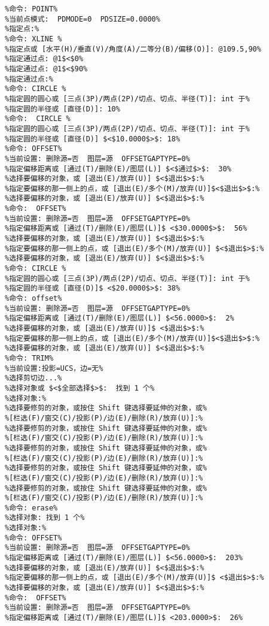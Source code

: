 \begin{lstlisting}
%命令: POINT%
%当前点模式:  PDMODE=0  PDSIZE=0.0000%
%指定点:%
%命令: XLINE %
%指定点或 [水平(H)/垂直(V)/角度(A)/二等分(B)/偏移(O)]: @109.5,90%
%指定通过点: @1$<$0%
%指定通过点: @1$<$90%
%指定通过点:%
%命令: CIRCLE %
%指定圆的圆心或 [三点(3P)/两点(2P)/切点、切点、半径(T)]: int 于%
%指定圆的半径或 [直径(D)]: 10%
%命令:  CIRCLE %
%指定圆的圆心或 [三点(3P)/两点(2P)/切点、切点、半径(T)]: int 于%
%指定圆的半径或 [直径(D)] $<$10.0000$>$: 18%
%命令: OFFSET%
%当前设置: 删除源=否  图层=源  OFFSETGAPTYPE=0%
%指定偏移距离或 [通过(T)/删除(E)/图层(L)] $<$通过$>$:  30%
%选择要偏移的对象，或 [退出(E)/放弃(U)] $<$退出$>$:%
%指定要偏移的那一侧上的点，或 [退出(E)/多个(M)/放弃(U)]$<$退出$>$:%
%选择要偏移的对象，或 [退出(E)/放弃(U)] $<$退出$>$:%
%命令:  OFFSET%
%当前设置: 删除源=否  图层=源  OFFSETGAPTYPE=0%
%指定偏移距离或 [通过(T)/删除(E)/图层(L)]$ <$30.0000$>$:  56%
%选择要偏移的对象，或 [退出(E)/放弃(U)] $<$退出$>$:%
%指定要偏移的那一侧上的点，或 [退出(E)/多个(M)/放弃(U)] $<$退出$>$:%
%选择要偏移的对象，或 [退出(E)/放弃(U)] $<$退出$>$:%
%命令: CIRCLE %
%指定圆的圆心或 [三点(3P)/两点(2P)/切点、切点、半径(T)]: int 于%
%指定圆的半径或 [直径(D)]$ <$20.0000$>$: 38%
%命令: offset%
%当前设置: 删除源=否  图层=源  OFFSETGAPTYPE=0%
%指定偏移距离或 [通过(T)/删除(E)/图层(L)] $<56.0000>$:  2%
%选择要偏移的对象，或 [退出(E)/放弃(U)]$ <$退出$>$:%
%指定要偏移的那一侧上的点，或 [退出(E)/多个(M)/放弃(U)]$<$退出$>$:%
%选择要偏移的对象，或 [退出(E)/放弃(U)] $<$退出$>$:%
%命令: TRIM%
%当前设置:投影=UCS，边=无%
%选择剪切边...%
%选择对象或 $<$全部选择$>$:  找到 1 个%
%选择对象:%
%选择要修剪的对象，或按住 Shift 键选择要延伸的对象，或%
%[栏选(F)/窗交(C)/投影(P)/边(E)/删除(R)/放弃(U)]:%
%选择要修剪的对象，或按住 Shift 键选择要延伸的对象，或%
%[栏选(F)/窗交(C)/投影(P)/边(E)/删除(R)/放弃(U)]:%
%选择要修剪的对象，或按住 Shift 键选择要延伸的对象，或%
%[栏选(F)/窗交(C)/投影(P)/边(E)/删除(R)/放弃(U)]:%
%选择要修剪的对象，或按住 Shift 键选择要延伸的对象，或%
%[栏选(F)/窗交(C)/投影(P)/边(E)/删除(R)/放弃(U)]:%
%选择要修剪的对象，或按住 Shift 键选择要延伸的对象，或%
%[栏选(F)/窗交(C)/投影(P)/边(E)/删除(R)/放弃(U)]:%
%命令: erase%
%选择对象: 找到 1 个%
%选择对象:%
%命令: OFFSET%
%当前设置: 删除源=否  图层=源  OFFSETGAPTYPE=0%
%指定偏移距离或 [通过(T)/删除(E)/图层(L)] $<56.0000>$:  203%
%选择要偏移的对象，或 [退出(E)/放弃(U)] $<$退出$>$:%
%指定要偏移的那一侧上的点，或 [退出(E)/多个(M)/放弃(U)]$ <$退出$>$:%
%选择要偏移的对象，或 [退出(E)/放弃(U)] $<$退出$>$:%
%命令:  OFFSET%
%当前设置: 删除源=否  图层=源  OFFSETGAPTYPE=0%
%指定偏移距离或 [通过(T)/删除(E)/图层(L)]$ <203.0000>$:  26%

\end{lstlisting}
